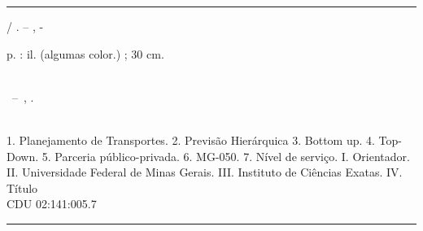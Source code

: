 \documentclass[
	12pt,				%
	openright,			%
	twoside,			%
	a4paper,			%
	english,			%
	french,				%
	spanish,			%
	brazil				%
	]{abntex2}
\begin{document}
\frenchspacing 

\imprimircapa
\imprimirfolhaderosto*


%
%     
\begin{fichacatalografica}
	\vspace*{\fill}					%
	\hrule							%
	\begin{center}					%
	\begin{minipage}[c]{12.5cm}		%
	
	\imprimirautor
	
	\hspace{0.5cm} \imprimirtitulo  / \imprimirautor. --
	\imprimirlocal, \imprimirdata-
	
	\hspace{0.5cm} \pageref{LastPage} p. : il. (algumas color.) ; 30 cm.\\
	
	\hspace{0.5cm} \imprimirorientadorRotulo~\imprimirorientador\\
	
	\hspace{0.5cm}
	\parbox[t]{\textwidth}{\imprimirtipotrabalho~--~\imprimirinstituicao,
	\imprimirdata.}\\
	
	\hspace{0.5cm}
		1. Planejamento de Transportes.
		2. Previsão Hierárquica
		3. Bottom up.
		4. Top-Down.
		5. Parceria público-privada.
		6. MG-050.
		7. Nível de serviço.
		I. Orientador.
		II. Universidade Federal de Minas Gerais.
		III. Instituto de Ciências Exatas.
		IV. Título\\ 			
	
	\hspace{8.75cm} CDU 02:141:005.7\\
	
	\end{minipage}
	\end{center}
	\hrule
\end{fichacatalografica}
\end{document}
